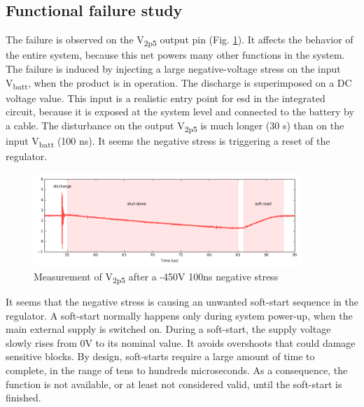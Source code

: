\subsection{Functional failure study}
\label{sec:failure-case-study}

The failure is observed on the V\textsubscript{2p5} output pin (Fig. \ref{fig:meas-reset-v2p5}).
It affects the behavior of the entire system, because this net powers many other functions in the system.
The failure is induced by injecting a large negative-voltage stress on the input V\textsubscript{batt}, when the product is in operation.
The discharge is superimposed on a DC voltage value.
This input is a realistic entry point for \gls{esd} in the integrated circuit, because it is exposed at the system level and connected to the battery by a cable.
The disturbance on the output V\textsubscript{2p5} is much longer (30 \textmu{}s) than on the input V\textsubscript{batt} (100 ns).
It seems the negative stress is triggering a reset of the regulator.

\begin{figure}[!h]
  \centering
  \includegraphics[width=0.9\textwidth]{src/3/figures/v2p5_measure.png}
  \caption{Measurement of V\textsubscript{2p5} after a -450V 100ns negative stress}
  \label{fig:meas-reset-v2p5}
\end{figure}

It seems that the negative stress is causing an unwanted \gls{soft-start} sequence in the regulator.
A soft-start normally happens only during system power-up, when the main external supply is switched on.
During a soft-start, the supply voltage slowly rises from 0V to its nominal value.
It avoids overshoots that could damage sensitive blocks.
By design, soft-starts require a large amount of time to complete, in the range of tens to hundreds microseconds.
As a consequence, the function is not available, or at least not considered valid, until the soft-start is finished.

